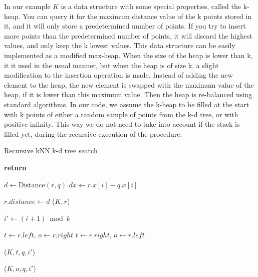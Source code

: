 In our example $K$ is a data structure with some special properties, called the k-heap. You can query it for the maximum distance value of the k points stored in it, and it will only store a predetermined number of points. If you try to insert more points than the predetermined number of points, it will discard the highest values, and only keep the k lowest values. This data structure can be easily implemented as a modified max-heap\citep[Chapter 6]{Cormen:2001}. When the size of the heap is lower than k, it it used in the usual manner, but when the heap is of size k, a slight modification to the insertion operation is made. Instead of adding the new element to the heap, the new element is swapped with the maximum value of the heap, if it is lower than this maximum value. Then the heap is re-balanced using standard algorithms. In our code, we assume the k-heap to be filled at the start with k points of either a random sample of points from the k-d tree, or with positive infinity. This way we do not need to take into account if the stack is filled yet, during the recursive execution of the procedure.

\begin{algorithm}
\caption{Recursive kNN k-d tree search}
\label{alg:recursive_knn_kd_tree_search}
\begin{algorithmic}
         
            \State \textbf{return}
        \EndIf

        \State $d \gets \text{Distance}(r, q)$
        \State $dx \gets r.x[i] - q.x[i]$

         
            \State $r.distance \gets d$
            \State {}($K, r$)
        \EndIf

        \State $i' \gets (i + 1) \bmod k$ 

          
            \State $t \gets r.left$, $o \gets r.right$
        \Else
            \State $t \gets r.right$, $o \gets r.left$
        \EndIf

        \State {}($K, t, q, i'$)

         
            \State {}($K, o, q, i'$)
        \EndIf
    \EndProcedure
\end{algorithmic}
\end{algorithm}

